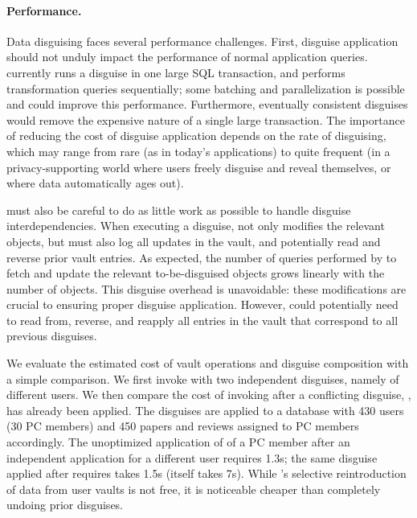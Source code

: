 \paragraph{Performance.}
\label{sec:perf}

Data disguising faces several performance challenges. 
%
First, disguise application should not unduly impact the performance of normal application queries.
\sys currently runs a disguise in one large SQL transaction, and performs transformation queries
sequentially; some batching and parallelization is possible and could improve this performance.
Furthermore, eventually consistent disguises would remove the expensive nature of a single large
transaction.  The importance of reducing the cost of disguise application depends on the rate of
disguising, which may range from rare (as in today's applications) to quite frequent (in a
privacy-supporting world where users freely disguise and reveal themselves, or where data
automatically ages out).

%
\sys must also be careful to do as little work as possible to handle disguise interdependencies. 
When executing a disguise, \sys not only modifies the relevant objects, but must also 
log all updates in the vault, and potentially read and reverse prior vault entries.
%
As expected, the number of queries performed by \sys to fetch and update the relevant to-be-disguised objects
grows linearly with the number of objects. This disguise overhead is unavoidable: these
modifications are crucial to ensuring proper disguise application. 
However, \sys could potentially need to read from, reverse, and reapply all entries in the vault
that correspond to all previous disguises.

We evaluate the estimated cost of vault operations and disguise composition with a simple
comparison. We first invoke \sys with two independent disguises, namely \hrtbf of different
users. We then compare the cost of invoking \hrtbf after a conflicting disguise, \hconfanon, has
already been applied.
The disguises are applied to a database with 430 users (30 PC members) and 450 papers and
reviews assigned to PC members accordingly.
The unoptimized application of \hrtbf of a PC member after an independent \hrtbf application for a different user requires 1.3s;
the same \hrtbf disguise applied after \hconfanon requires takes 1.5s (\hconfanon itself takes
7s). While \sys's selective reintroduction of data from user vaults is not free, it is noticeable
cheaper than completely undoing prior disguises.

